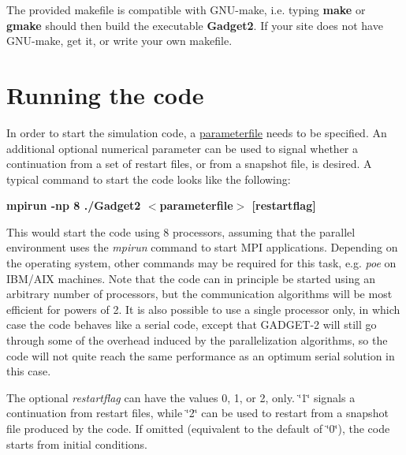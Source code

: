 \-The provided makefile is compatible with \-G\-N\-U-\/make, i.\-e. typing {\bfseries make} or {\bfseries gmake} should then build the executable {\bfseries \-Gadget2}. \-If your site does not have \-G\-N\-U-\/make, get it, or write your own makefile.\hypertarget{index_howtorun}{}\section{\-Running the code}\label{index_howtorun}
\-In order to start the simulation code, a \hyperlink{parameterfile}{parameterfile} needs to be specified. \-An additional optional numerical parameter can be used to signal whether a continuation from a set of restart files, or from a snapshot file, is desired. \-A typical command to start the code looks like the following\-: \par
 \par


{\bfseries  mpirun -\/np 8 ./\-Gadget2 $<$parameterfile$>$ \mbox{[}restartflag\mbox{]}} \par
 \par


\-This would start the code using 8 processors, assuming that the parallel environment uses the {\itshape mpirun\/} command to start \-M\-P\-I applications. \-Depending on the operating system, other commands may be required for this task, e.\-g. {\itshape poe\/} on \-I\-B\-M/\-A\-I\-X machines. \-Note that the code can in principle be started using an arbitrary number of processors, but the communication algorithms will be most efficient for powers of 2. \-It is also possible to use a single processor only, in which case the code behaves like a serial code, except that \-G\-A\-D\-G\-E\-T-\/2 will still go through some of the overhead induced by the parallelization algorithms, so the code will not quite reach the same performance as an optimum serial solution in this case.

\-The optional {\itshape restartflag\/} can have the values 0, 1, or 2, only. \char`\"{}1\char`\"{} signals a continuation from restart files, while \char`\"{}2\char`\"{} can be used to restart from a snapshot file produced by the code. \-If omitted (equivalent to the default of \char`\"{}0\char`\"{}), the code starts from initial conditions. 